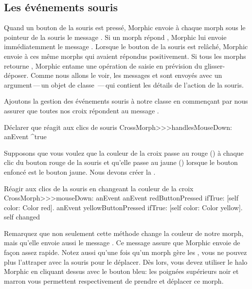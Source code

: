 \documentclass[a4paper,10pt,twoside]{book}
\begin{document}
\subsection{Les \'ev\'enements souris}

Quand un bouton de la souris est press\'e, Morphic envoie \`a chaque
morph sous le pointeur de la souris le message
. Si un morph r\'epond , Morphic lui
envoie imm\'ediatemment le message . Lorsque
le bouton de la souris est rel\^ach\'e, Morphic envoie
  \`a ces m\^eme morphs qui avaient r\'epondus
positivement. Si tous les morphs retourne , Morphic entame
une op\'eration de
saisie en pr\'evision du glisser-d\'eposer.
Comme nous allons le voir, les messages  et 
sont envoy\'es avec un argument\,---\,un objet de classe
\,---\,qui contient les d\'etails de l'action de la souris.

Ajoutons la gestion des \'ev\'enements souris \`a notre classe
 en commen\c{c}ant par nous assurer que toutes nos
croix r\'epondent  au message .

\begin{method}{D\'eclarer que  r\'eagit aux clics de souris}
CrossMorph>>>handlesMouseDown: anEvent
	^true
\end{method}

Supposons que vous voulez que la couleur de la croix passe au rouge
()
\`a chaque clic du bouton rouge de la souris et qu'elle passe au jaune
()
lorsque le bouton enfonc\'e est le bouton jaune. 
Nous devons cr\'eer la .

\begin{method}[mouseDown]{R\'eagir aux clics de la souris en changeant la couleur de la croix}
CrossMorph>>>mouseDown: anEvent
	anEvent redButtonPressed
		ifTrue: [self color: Color red].
	anEvent yellowButtonPressed
		ifTrue: [self color: Color yellow].
	self changed
\end{method}

Remarquez que non seulement cette m\'ethode change la couleur de notre
morph, mais qu'elle envoie aussi le message .
Ce message assure que Morphic envoie 
de fa\c{c}on assez rapide.
Notez aussi qu'une fois qu'un morph g\`ere les , vous ne pouvez plus l'attraper avec la souris pour le
d\'eplacer.
D\`es lors, vous devez utiliser le halo Morphic en cliquant dessus avec le
bouton bleu: les poign\'ees sup\'erieurs noir \grabHandle{}
et marron \moveHandle{} 
vous permettent respectivement de prendre et d\'eplacer ce morph.
\end{document}
